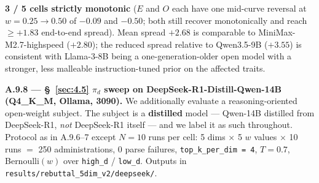 \begin{table}[t]
\centering
{}
\caption{$\pi_d$ sweep on Llama-3-8B Q4 served via Ollama. 3 / 5 cells strictly monotonic ($E$ and $O$ each have one mid-curve reversal $\leq 0.50$); mean spread $+2.68$ is comparable to MiniMax-M2.7-highspeed ($+2.80$).}
\label{tab:pi-l8b}
\end{table}

\textbf{3 / 5 cells strictly monotonic} ($E$ and $O$ each have one mid-curve reversal at $w{=}0.25{\to}0.50$ of $-0.09$ and $-0.50$; both still recover monotonically and reach $\geq +1.83$ end-to-end spread). Mean spread $+2.68$ is comparable to MiniMax-M2.7-highspeed ($+2.80$); the reduced spread relative to Qwen3.5-9B ($+3.55$) is consistent with Llama-3-8B being a one-generation-older open model with a stronger, less malleable instruction-tuned prior on the affected traits.

\label{app:A.9.8}
\textbf{A.9.8 --- \S~\ref{sec:4.5} $\pi_d$ sweep on DeepSeek-R1-Distill-Qwen-14B (Q4\_K\_M, Ollama, 3090).} We additionally evaluate a reasoning-oriented open-weight subject. The subject is a \textbf{distilled} model --- Qwen-14B distilled from DeepSeek-R1, \textit{not} DeepSeek-R1 itself --- and we label it as such throughout. Protocol as in A.9.6--7 except $N=10$ runs per cell: 5 dims $\times$ 5 $w$ values $\times$ 10 runs $=$ 250 administrations, 0 parse failures, \texttt{top\_\allowbreak{}k\_\allowbreak{}per\_\allowbreak{}dim = 4}, $T=0.7$, Bernoulli$(w)$ over \texttt{high\_\allowbreak{}d} / \texttt{low\_\allowbreak{}d}. Outputs in \texttt{results/\allowbreak{}rebuttal\_\allowbreak{}5dim\_\allowbreak{}v2/\allowbreak{}deepseek/\allowbreak{}}.

